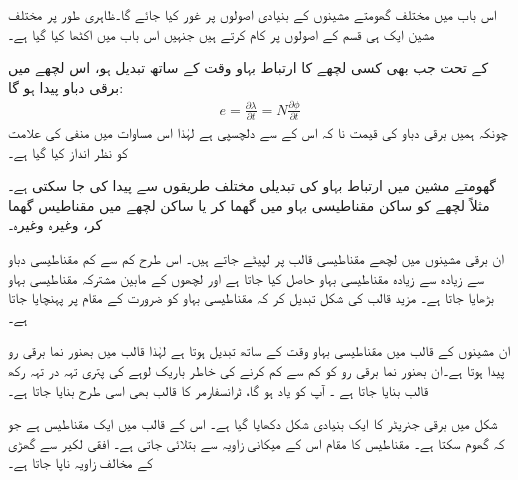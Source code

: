 اس باب میں مختلف گھومتے مشینوں کے بنیادی اصولوں پر غور کیا جائے گا۔ظاہری طور پر مختلف مشین ایک ہی قسم کے اصولوں پر کام کرتے ہیں جنہیں اس باب میں اکٹھا کیا گیا ہے۔

 کے تحت جب بھی کسی لچھے کا ارتباط بہاو   وقت کے ساتھ تبدیل ہو، اس لچھے میں برقی دباو پیدا ہو گا:
\begin{align}
e=\frac{\partial \lambda}{\partial t}=N \frac{\partial \phi}{\partial t}
\end{align}
چونکہ ہمیں برقی دباو کی قیمت نا کہ اس کے   سے دلچسپی ہے لہٰذا اس مساوات میں منفی کی علامت کو نظر انداز کیا گیا ہے۔

گھومتے مشین میں ارتباط بہاو کی تبدیلی مختلف طریقوں سے پیدا کی جا سکتی ہے۔مثلاً  لچھے کو ساکن مقناطیسی بہاو میں گھما کر یا  ساکن لچھے میں مقناطیس گھما کر، وغیرہ وغیرہ۔

ان برقی مشینوں میں لچھے مقناطیسی قالب  پر لپیٹے جاتے ہیں۔ اس طرح کم سے کم مقناطیسی دباو سے زیادہ سے زیادہ مقناطیسی بہاو حاصل کیا جاتا ہے اور لچھوں کے مابین مشترکہ مقناطیسی بہاو بڑھایا جاتا ہے۔ مزید قالب کی شکل تبدیل کر کہ مقناطیسی بہاو کو ضرورت کے مقام پر پہنچایا جاتا ہے۔

ان مشینوں کے قالب میں مقناطیسی بہاو وقت کے ساتھ تبدیل ہوتا ہے لہٰذا قالب میں بھنور نما برقی رو پیدا ہوتا ہے۔ان بھنور نما برقی رو کو کم سے کم کرنے کی خاطر  باریک لوہے کی پتری تہہ در تہہ رکھ قالب بنایا جاتا ہے ۔  آپ کو یاد ہو گا، ٹرانسفارمر کا قالب بھی اسی طرح بنایا جاتا ہے۔

شکل   میں  برقی جنریٹر کا ایک بنیادی شکل دکھایا گیا ہے۔ اس کے قالب میں ایک مقناطیس ہے جو کہ گھوم سکتا ہے۔ مقناطیس کا مقام اس کے میکانی زاویہ  سے بتلائی جاتی ہے۔ افقی لکیر سے گھڑی کے مخالف زاویہ  ناپا جاتا ہے۔

